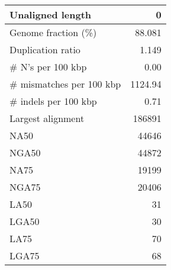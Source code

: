 \documentclass[12pt,a4paper]{article}
\begin{document}
\begin{table}[ht]
\begin{center}
\begin{tabular}{|l*{1}{|r}|}
Unaligned length & 0 \\ \hline
Genome fraction (\%) & 88.081 \\ \hline
Duplication ratio & 1.149 \\ \hline
\# N's per 100 kbp & 0.00 \\ \hline
\# mismatches per 100 kbp & 1124.94 \\ \hline
\# indels per 100 kbp & 0.71 \\ \hline
Largest alignment & 186891 \\ \hline
NA50 & 44646 \\ \hline
NGA50 & 44872 \\ \hline
NA75 & 19199 \\ \hline
NGA75 & 20406 \\ \hline
LA50 & 31 \\ \hline
LGA50 & 30 \\ \hline
LA75 & 70 \\ \hline
LGA75 & 68 \\ \hline
\end{tabular}
\end{center}
\end{table}
\end{document}
